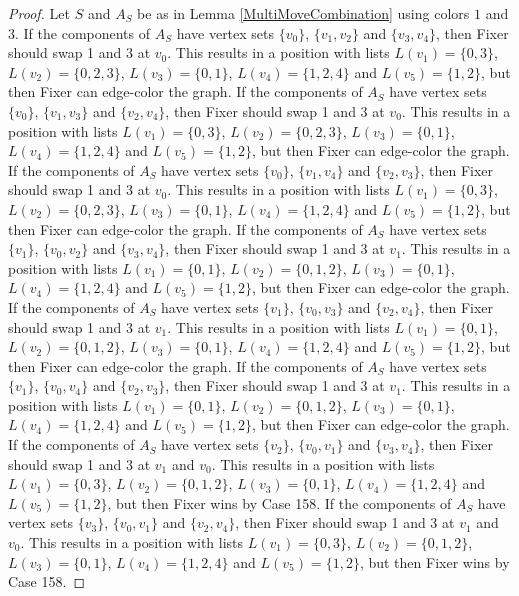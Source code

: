 \documentclass[12pt]{amsart}
\theoremstyle{plain}
\theoremstyle{definition}
\theoremstyle{remark}
\begin{document}
\begin{proof}
Let $S$ and $A_S$ be as in Lemma \ref{MultiMoveCombination} using colors $1$ and $3$. If the components of $A_S$ have vertex sets $\{v_0\}$, $\{v_1, v_2\}$ and $\{v_3, v_4\}$, then Fixer should swap 1 and 3 at $v_0$. This results in a position with lists $L(v_1) = \{0, 3\}$, $L(v_2) = \{0, 2, 3\}$, $L(v_3) = \{0, 1\}$, $L(v_4) = \{1, 2, 4\}$ and $L(v_5) = \{1, 2\}$, but then Fixer can edge-color the graph.
If the components of $A_S$ have vertex sets $\{v_0\}$, $\{v_1, v_3\}$ and $\{v_2, v_4\}$, then Fixer should swap 1 and 3 at $v_0$. This results in a position with lists $L(v_1) = \{0, 3\}$, $L(v_2) = \{0, 2, 3\}$, $L(v_3) = \{0, 1\}$, $L(v_4) = \{1, 2, 4\}$ and $L(v_5) = \{1, 2\}$, but then Fixer can edge-color the graph.
If the components of $A_S$ have vertex sets $\{v_0\}$, $\{v_1, v_4\}$ and $\{v_2, v_3\}$, then Fixer should swap 1 and 3 at $v_0$. This results in a position with lists $L(v_1) = \{0, 3\}$, $L(v_2) = \{0, 2, 3\}$, $L(v_3) = \{0, 1\}$, $L(v_4) = \{1, 2, 4\}$ and $L(v_5) = \{1, 2\}$, but then Fixer can edge-color the graph.
If the components of $A_S$ have vertex sets $\{v_1\}$, $\{v_0, v_2\}$ and $\{v_3, v_4\}$, then Fixer should swap 1 and 3 at $v_1$. This results in a position with lists $L(v_1) = \{0, 1\}$, $L(v_2) = \{0, 1, 2\}$, $L(v_3) = \{0, 1\}$, $L(v_4) = \{1, 2, 4\}$ and $L(v_5) = \{1, 2\}$, but then Fixer can edge-color the graph.
If the components of $A_S$ have vertex sets $\{v_1\}$, $\{v_0, v_3\}$ and $\{v_2, v_4\}$, then Fixer should swap 1 and 3 at $v_1$. This results in a position with lists $L(v_1) = \{0, 1\}$, $L(v_2) = \{0, 1, 2\}$, $L(v_3) = \{0, 1\}$, $L(v_4) = \{1, 2, 4\}$ and $L(v_5) = \{1, 2\}$, but then Fixer can edge-color the graph.
If the components of $A_S$ have vertex sets $\{v_1\}$, $\{v_0, v_4\}$ and $\{v_2, v_3\}$, then Fixer should swap 1 and 3 at $v_1$. This results in a position with lists $L(v_1) = \{0, 1\}$, $L(v_2) = \{0, 1, 2\}$, $L(v_3) = \{0, 1\}$, $L(v_4) = \{1, 2, 4\}$ and $L(v_5) = \{1, 2\}$, but then Fixer can edge-color the graph.
If the components of $A_S$ have vertex sets $\{v_2\}$, $\{v_0, v_1\}$ and $\{v_3, v_4\}$, then Fixer should swap 1 and 3 at $v_1$ and $v_0$. This results in a position with lists $L(v_1) = \{0, 3\}$, $L(v_2) = \{0, 1, 2\}$, $L(v_3) = \{0, 1\}$, $L(v_4) = \{1, 2, 4\}$ and $L(v_5) = \{1, 2\}$, but then Fixer wins by Case 158.
If the components of $A_S$ have vertex sets $\{v_3\}$, $\{v_0, v_1\}$ and $\{v_2, v_4\}$, then Fixer should swap 1 and 3 at $v_1$ and $v_0$. This results in a position with lists $L(v_1) = \{0, 3\}$, $L(v_2) = \{0, 1, 2\}$, $L(v_3) = \{0, 1\}$, $L(v_4) = \{1, 2, 4\}$ and $L(v_5) = \{1, 2\}$, but then Fixer wins by Case 158.

\end{proof}
\end{document}
